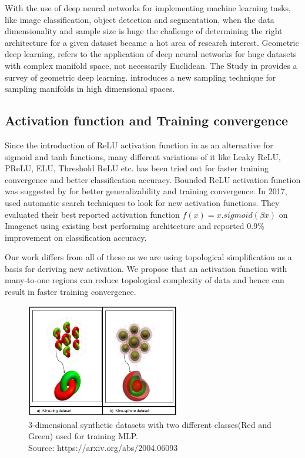 \documentclass[wcp]{jmlr}
\begin{document}
With the use of deep neural networks for implementing machine learning tasks, like image classification, object detection and segmentation, when the data dimensionality and sample size is huge the challenge of determining the right architecture for a given dataset became a hot area of research interest. Geometric deep learning, refers to the application of deep neural networks for huge datasets with complex manifold space, not necessarily Euclidean. The Study in  \cite{bronstein2017geometric} provides a  survey of geometric deep learning.  \cite{saucan2007geometric} introduces a new sampling technique for sampling manifolds in high dimensional spaces.

\subsection{Activation function and Training convergence}
Since the introduction of ReLU activation function in \cite{alexnet} as an alternative for sigmoid and tanh functions, many different variations of it like Leaky ReLU, PReLU, ELU, Threshold ReLU etc. has been tried out for faster training convergence and better classification accuracy. Bounded ReLU activation function was suggested by \cite{liew2016bounded} for better generalizability and training convergence. In 2017, \cite{ramachandran2017searching} used automatic search techniques to look for new activation functions. They evaluated their  best reported activation function $f(x)=x.sigmoid(\beta x)$ on Imagenet using existing best performing architecture and reported 0.9\% improvement on classification accuracy.

Our work differs from all of these as we are using topological simplification as a basis for deriving new activation.  We propose that an activation function with many-to-one regions can reduce topological complexity of data and hence can result in faster training convergence.

\begin{figure}[h]
\begin{center}
\includegraphics[width=0.6\textwidth]{images/nine_ring_and_nine_sphere.png}
\caption{3-dimensional synthetic datasets with two different classes(Red and Green) used for training MLP. \\ \footnotesize{Source: https://arxiv.org/abs/2004.06093}}
  \label{fig:nine_ring_and_nine_sphere}
\end{center}
\end{figure}
\end{document}
